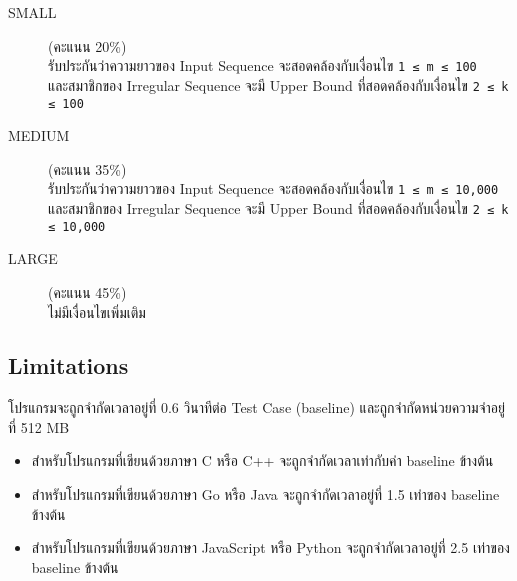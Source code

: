 \begin{description}
    \item[SMALL] (คะแนน 20\%) \\
        รับประกันว่าความยาวของ Input Sequence จะสอดคล้องกับเงื่อนไข \lstinline{1 ≤ m ≤ 100} \\ และสมาชิกของ Irregular Sequence จะมี Upper Bound ที่สอดคล้องกับเงื่อนไข \lstinline{2 ≤ k ≤ 100}
    \item[MEDIUM] (คะแนน 35\%) \\
        รับประกันว่าความยาวของ Input Sequence จะสอดคล้องกับเงื่อนไข \lstinline{1 ≤ m ≤ 10,000} \\ และสมาชิกของ Irregular Sequence จะมี Upper Bound ที่สอดคล้องกับเงื่อนไข \lstinline{2 ≤ k ≤ 10,000}
    \item[LARGE] (คะแนน 45\%) \\
        ไม่มีเงื่อนไขเพิ่มเติม
\end{description}


\subsection{Limitations}

\noindent
โปรแกรมจะถูกจำกัดเวลาอยู่ที่ 0.6 วินาทีต่อ Test Case (baseline) และถูกจำกัดหน่วยความจำอยู่ที่ 512 MB
\begin{itemize}
    \item 
        สำหรับโปรแกรมที่เขียนด้วยภาษา C หรือ C++ จะถูกจำกัดเวลาเท่ากับค่า baseline ข้างต้น
    \item 
        สำหรับโปรแกรมที่เขียนด้วยภาษา Go หรือ Java จะถูกจำกัดเวลาอยู่ที่ 1.5 เท่าของ baseline ข้างต้น
    \item 
        สำหรับโปรแกรมที่เขียนด้วยภาษา JavaScript หรือ Python จะถูกจำกัดเวลาอยู่ที่ 2.5 เท่าของ baseline ข้างต้น
\end{itemize}
